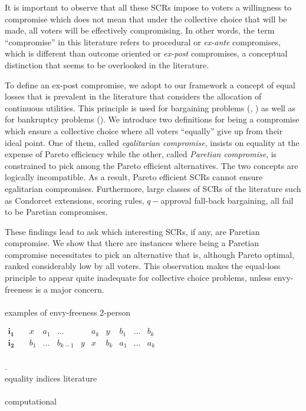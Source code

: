 \documentclass[version=3.21, pagesize, twoside=off, bibliography=totoc, DIV=calc, fontsize=12pt, a4paper]{scrartcl}
\begin{document}
It is important to observe that all these SCRs impose to voters a willingness to compromise which does not mean that under the collective choice that will be made, all voters will be effectively compromising. In other words, the term “compromise” in this literature refers to procedural or \textit{ex-ante} compromises, which is different than outcome oriented or \textit{ex-post} compromises, a conceptual distinction that seems to be overlooked in the literature.

To define an ex-post compromise, we adopt to our framework a concept of equal losses that is prevalent in the literature that considers the allocation of continuous utilities. This principle is used for bargaining problems (\cite{Chun1988}, \cite{Chun1991})  as well as for bankruptcy problems (\cite{Herrero2001}).
We introduce two definitions for being a compromise which ensure a collective choice where all voters “equally” give up from their ideal point. One of them, called \textit{egalitarian compromise}, insists on equality at the expense of Pareto efficiency while the other, called \textit{Paretian compromise}, is constrained to pick among the Pareto efficient alternatives. The two concepts are logically incompatible. As a result, Pareto efficient SCRs cannot ensure egalitarian compromises. Furthermore, large classes of SCRs of the literature such as Condorcet extensions, scoring rules, $q-$approval fall-back bargaining, all fail to be Paretian compromises.

These findings lead to ask which interesting SCRs, if any, are Paretian compromise. We show that there are instances where being a Paretian compromise necessitates to pick an alternative that is, although Pareto optimal, ranked considerably low by all voters. This observation makes the equal-loss principle to appear quite inadequate for collective choice problems, unless envy-freeness is a major concern.
\\ \\
examples of envy-freeness 2-person
\begin{example}
	\begin{center}
		$
		\begin{array}{cccccccccc}
		\mathbf{i_1} \quad &x&a_1&\dots&&a_k&y&b_1&\dots&b_k\\
		\mathbf{i_2} \quad &b_1&\dots&b_{k-1}&y&x&b_k&a_1&\dots&a_k\\
		\end{array}
		$
	\end{center}
\end{example}
.\\
equality indices literature
\\ \\
computational
\end{document}
